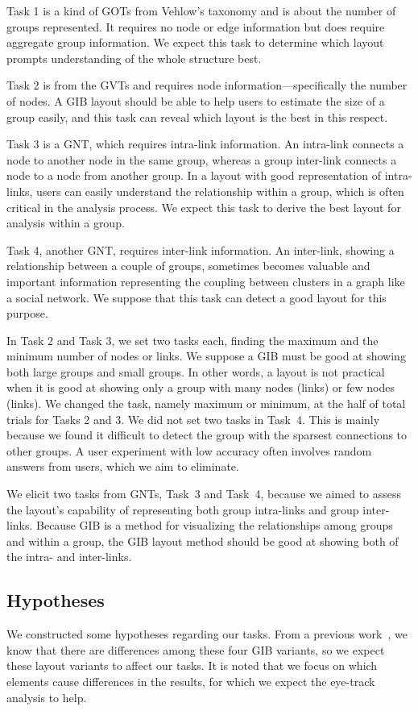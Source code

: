 \documentclass[review]{vgtc}                 %
\begin{document}
Task 1 is a kind of GOTs from Vehlow's taxonomy and is about the number of groups represented. It requires no node or edge information but does require aggregate group information. We expect this task to determine which layout prompts understanding of the whole structure best.

Task 2 is from the GVTs and requires node information---specifically the number of nodes. A GIB layout should be able to help users to estimate the size of a group easily, and this task can reveal which layout is the best in this respect.

Task 3 is a GNT, which requires intra-link information. An intra-link connects a node to another node in the same group, whereas a group inter-link connects a node to a node from another group.
In a layout with good representation of intra-links, users can easily understand the relationship within a group, which is often critical in the analysis process. We expect this task to derive the best layout for analysis within a group.

Task 4, another GNT, requires inter-link information.
An inter-link, showing a relationship between a couple of groups, sometimes becomes valuable and important information representing the coupling between clusters in a graph like a social network. We suppose that this task can detect a good layout for this purpose.

In Task 2 and Task 3, we set two tasks each, finding the maximum and the minimum number of nodes or links.
We suppose a GIB must be good at showing both large groups and small groups. In other words, a layout is not practical when it is good at showing only a group with many nodes (links) or few nodes (links).
We changed the task, namely maximum or minimum, at the half of total trials for Tasks 2 and 3.
We did not set two tasks in Task~4. This is mainly because we found it difficult to detect the group with the sparsest connections to other groups. A user experiment with low accuracy often involves random answers from users, which we aim to eliminate.

We elicit two tasks from GNTs, Task~3 and Task~4, because we aimed to assess the layout's capability of representing both group intra-links and group inter-links.
Because GIB is a method for visualizing the relationships among groups and within a group, the GIB layout method should be good at showing both of the intra- and inter-links.

\subsection{Hypotheses}
We constructed some hypotheses regarding our tasks.
From a previous work~\cite{chaturvedi2014group}, we know that there are differences among these four GIB variants, so we expect these layout variants to affect our tasks. It is noted that we focus on which elements cause differences in the results, for which we expect the eye-track analysis to help.
\end{document}
